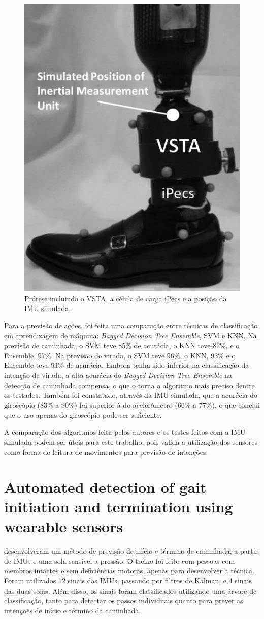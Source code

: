\begin{figure}[h]
	\caption{\label{fig:rel_turnintent_1}Prótese incluindo o VSTA, a célula de carga iPecs e a posição da IMU simulada.}
	\begin{center}
	    \includegraphics[width=.4\textwidth]{resources/rel_pew_turnintent_1}
	\end{center}
\end{figure}

Para a previsão de ações, foi feita uma comparação entre técnicas de classificação em aprendizagem de máquina: \textit{Bagged Decision Tree Ensemble}, SVM e KNN. Na previsão de caminhada, o SVM teve 85\% de acurácia, o KNN teve 82\%, e o Ensemble, 97\%. Na previsão de virada, o SVM teve 96\%, o KNN, 93\% e o Ensemble teve 91\% de acurácia. Embora tenha sido inferior na classificação da intenção de virada, a alta acurácia do \textit{Bagged Decision Tree Ensemble} na detecção de caminhada compensa, o que o torna o algoritmo mais preciso dentre os testados. Também foi constatado, através da IMU simulada, que a acurácia do giroscópio (83\% a 90\%) foi superior à do acelerômetro (66\% a 77\%), o que conclui que o uso apenas do giroscópio pode ser suficiente.

A comparação dos algoritmos feita pelos autores  e os testes feitos com a IMU simulada podem ser úteis para este trabalho, pois valida a utilização dos sensores como forma de leitura de movimentos para previsão de intenções.

\section{Automated detection of gait initiation and termination using wearable sensors}
\label{sec:rel_novak}
 desenvolveram um método de previsão de início e término de caminhada, a partir de IMUs e uma sola sensível a pressão. O treino foi feito com pessoas com membros intactos e sem deficiências motoras, apenas para desenvolver a técnica. Foram utilizados 12 sinais das IMUs, passando por filtros de Kalman, e 4 sinais das duas solas. Além disso, os sinais foram classificados utilizando uma árvore de classificação, tanto para detectar os passos individuais quanto para prever as intenções de início e término da caminhada.

